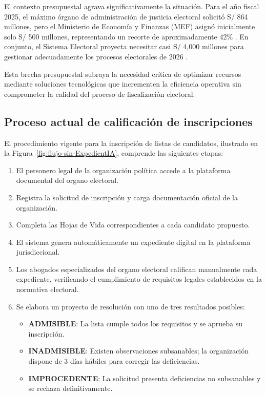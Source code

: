 \documentclass[12pt,a4paper,oneside]{book}
\begin{document}
El contexto presupuestal agrava significativamente la situación. Para el año fiscal 2025, el máximo órgano de administración de justicia electoral solicitó S/ 864 millones, pero el Ministerio de Economía y Finanzas (MEF) asignó inicialmente solo S/ 500 millones, representando un recorte de aproximadamente 42\% \cite{convoca2025presupuesto}. En conjunto, el Sistema Electoral proyecta necesitar casi S/ 4,000 millones para gestionar adecuadamente los procesos electorales de 2026 \cite{rpp2025elecciones}.

Esta brecha presupuestal subraya la necesidad crítica de optimizar recursos mediante soluciones tecnológicas que incrementen la eficiencia operativa sin comprometer la calidad del proceso de fiscalización electoral.

\subsection{Proceso actual de calificación de inscripciones}

El procedimiento vigente para la inscripción de listas de candidatos, ilustrado en la Figura~\ref{fig:flujo-sin-ExpedientIA}, comprende las siguientes etapas:

\begin{enumerate}
    \item El personero legal de la organización política accede a la plataforma documental del organo electoral.
    \item Registra la solicitud de inscripción y carga documentación oficial de la organización.
    \item Completa las Hojas de Vida correspondientes a cada candidato propuesto.
    \item El sistema genera automáticamente un expediente digital en la plataforma jurisdiccional.
    \item Los abogados especializados del organo electoral califican manualmente cada expediente, verificando el cumplimiento de requisitos legales establecidos en la normativa electoral.
    \item Se elabora un proyecto de resolución con uno de tres resultados posibles:
    \begin{itemize}
        \item \textbf{ADMISIBLE}: La lista cumple todos los requisitos y se aprueba su inscripción.
        \item \textbf{INADMISIBLE}: Existen observaciones subsanables; la organización dispone de 3 días hábiles para corregir las deficiencias.
        \item \textbf{IMPROCEDENTE}: La solicitud presenta deficiencias no subsanables y se rechaza definitivamente.
    \end{itemize}
\end{enumerate}
\end{document}
